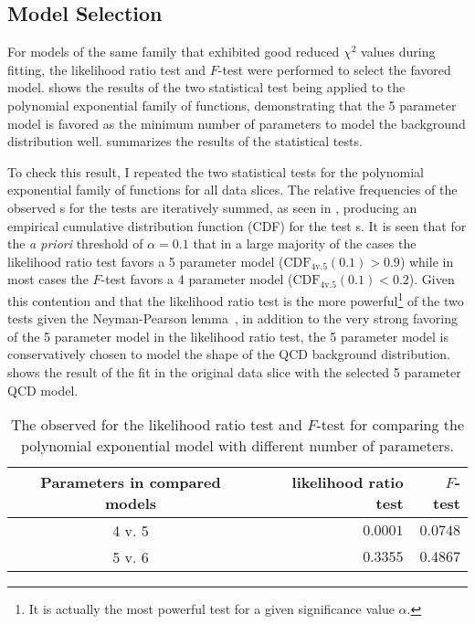 \subsection{Model Selection}\label{sec:model_selection}

For models of the same family that exhibited good reduced $\chi^2$ values during fitting, the likelihood ratio test and $F$-test were performed to select the favored model.
 shows the results of the two statistical test being applied to the polynomial exponential family of functions, demonstrating that the 5 parameter model is favored as the minimum number of parameters to model the background distribution well.
 summarizes the results of the statistical tests.

To check this result, I repeated the two statistical tests for the polynomial exponential family of functions for all \CRQCD{} data slices.
The relative frequencies of the observed \pvalue{}s for the tests are iteratively summed, as seen in , producing an empirical cumulative distribution function (CDF) for the test \pvalue{}s.
It is seen that for the \emph{a priori} threshold of $\alpha=0.1$ that in a large majority of the cases the likelihood ratio test favors a 5 parameter model ($\textrm{CDF}_{4\textrm{v.}5}\left(0.1\right) > 0.9$) while in most cases the $F$-test favors a 4 parameter model ($\textrm{CDF}_{4\textrm{v.}5}\left(0.1\right) < 0.2$).
Given this contention and that the likelihood ratio test is the more powerful\footnote{%
 It is actually the most powerful test for a given significance value $\alpha$.}
of the two tests given the Neyman-Pearson lemma~\cite{Neyman_Pearson_lemma}, in addition to the very strong favoring of the 5 parameter model in the likelihood ratio test, the 5 parameter model is conservatively chosen to model the shape of the QCD background distribution.
 shows the result of the fit in the original data slice with the selected 5 parameter QCD model.

\begin{table}[htbp]
 \centering
 \caption[The observed \pvalue{} for the likelihood ratio test and $F$-test for comparing the polynomial exponential model with different number of parameters.]{%
  The observed \pvalue{} for the likelihood ratio test and $F$-test for comparing the polynomial exponential model with different number of parameters.}
 \label{table:stat_test_parameters}
 \begin{tabular}{@{}crr@{}} \toprule
  Parameters in compared models & likelihood ratio test \pvalue{} & $F$-test \pvalue{} \\ \midrule
  4 v. 5                        & $0.0001$                        & $0.0748$           \\
  5 v. 6                        & $0.3355$                        & $0.4867$           \\
  \bottomrule
 \end{tabular}
\end{table}


